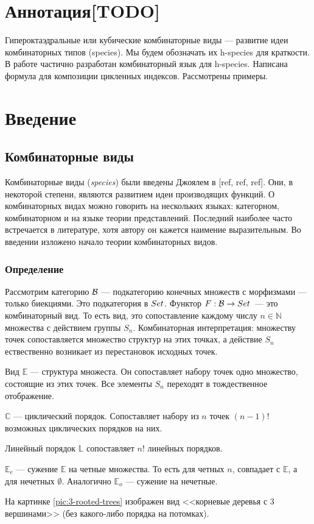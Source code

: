 \section{Аннотация[TODO]}
Гипероктаэдральные или кубические комбинаторные виды --- развитие идеи
комбинаторных типов (species). Мы будем обозначать их h-species для
краткости.
В работе частично разработан комбинаторный язык для h-species.
Написана формула для композиции цикленных индексов. Рассмотрены примеры.

\section{Введение}

\subsection{Комбинаторные виды}
Комбинаторные виды (\emph{species}) были введены Джоялем в [ref, ref, ref].
Они, в некоторой степени, являются развитием идеи производящих функций.
О комбинаторных видах можно говорить на нескольких языках: категорном,
комбинаторном и на языке теории представлений. Последний наиболее часто
встречается в литературе, хотя автору он кажется наимение выразительным.
Во введении изложено начало теории комбинаторных видов.
\subsubsection{Определение}
Рассмотрим категорию $\mathcal B$ --- подкатегорию конечных множеств с
морфизмами --- только биекциями. Это подкатегория в $Set$. Функтор
$F:\mathcal B \rightarrow Set$~--- это комбинаторный вид. То есть вид, это
сопоставление каждому числу $n \in \mathbb N$ множества с действием группы
$S_n$. Комбинаторная интерпретация: множеству точек сопоставляется
множество структур на этих точках, а действие $S_n$ ествественно возникает из
перестановок исходных точек. 
\begin{example}
Вид $\mathbb E$ --- структура множеста. Он
сопоставляет набору точек одно множество, состоящие из этих точек. Все элементы $S_n$
переходят в тождественное отображение. 
\end{example}
\begin{example}
$\mathbb C$ --- циклический порядок. Сопоставляет набору из $n$ точек $(n-1)!$
возможных циклических порядков на них. 
\end{example}
\begin{example}
Линейный порядок $\mathbb L$ сопоставляет $n!$ линейных
порядков. 
\end{example}
\begin{example}
$\mathbb E_e$ --- сужение $\mathbb E$ на четные множества. То есть для четных
$n$, совпадает с $\mathbb E$, а для нечетных $\emptyset$. Аналогично $\mathbb
E_o$ --- сужение на нечетные.
\end{example}
\begin{example}
На картинке \ref{pic:3-rooted-trees} изображен вид <<корневые
деревья с 3 вершинами>> (без какого-либо порядка на потомках).
\end{example}


